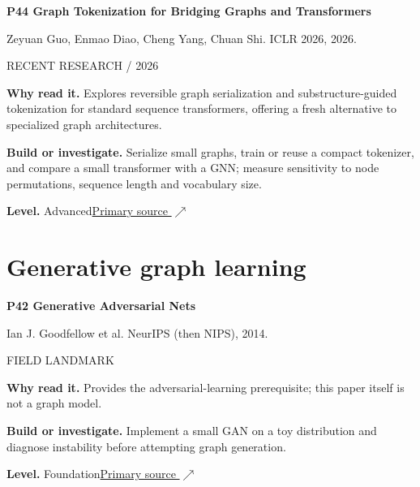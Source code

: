 \documentclass[11pt,letterpaper]{article}
\begin{document}
\begin{minipage}{\linewidth}
{\large\bfseries P44 Graph Tokenization for Bridging Graphs and Transformers}\par
Zeyuan Guo, Enmao Diao, Cheng Yang, Chuan Shi. ICLR 2026, 2026.\par
\textcolor{ink}{\small RECENT RESEARCH / 2026}\par
\textbf{Why read it.} Explores reversible graph serialization and substructure-guided tokenization for standard sequence transformers, offering a fresh alternative to specialized graph architectures.\par
\textbf{Build or investigate.} Serialize small graphs, train or reuse a compact tokenizer, and compare a small transformer with a GNN; measure sensitivity to node permutations, sequence length and vocabulary size.\par
\textbf{Level.} Advanced\quad\href{https://proceedings.iclr.cc/paper_files/paper/2026/hash/2c0781f2ed2d8054d4f27a19bd8c380b-Abstract-Conference.html}{Primary source $\nearrow$}\par
\end{minipage}\par\vspace{10pt}
\section*{Generative graph learning}
\begin{minipage}{\linewidth}
{\large\bfseries P42 Generative Adversarial Nets}\par
Ian J. Goodfellow et al. NeurIPS (then NIPS), 2014.\par
\textcolor{ink}{\small FIELD LANDMARK}\par
\textbf{Why read it.} Provides the adversarial-learning prerequisite; this paper itself is not a graph model.\par
\textbf{Build or investigate.} Implement a small GAN on a toy distribution and diagnose instability before attempting graph generation.\par
\textbf{Level.} Foundation\quad\href{https://papers.nips.cc/paper/2014/hash/f033ed80deb0234979a61f95710dbe25-Abstract.html}{Primary source $\nearrow$}\par
\end{minipage}\par\vspace{10pt}
\end{document}
